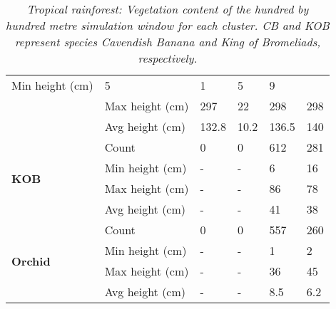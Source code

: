 \begin{table}[htb!]
\begin{tabular}{|p{2cm}|p{2cm}|p{2cm}|p{2cm}|p{2cm}|p{2cm}|}
						\multicolumn{1}{l|}{Min height (cm)} & 
						\multicolumn{1}{l|}{5} & 
						\multicolumn{1}{l|}{1} &
						\multicolumn{1}{l|}{5} & 
						\multicolumn{1}{l|}{9} \\\cline{2-6} &
						\multicolumn{1}{l|}{Max height (cm)} & 
						\multicolumn{1}{l|}{297} & 
						\multicolumn{1}{l|}{22} &
						\multicolumn{1}{l|}{298} & 
						\multicolumn{1}{l|}{298} \\\cline{2-6} &
						\multicolumn{1}{l|}{Avg height (cm)} & 
						\multicolumn{1}{l|}{132.8} & 
						\multicolumn{1}{l|}{10.2} &
						\multicolumn{1}{l|}{136.5} & 
						\multicolumn{1}{l|}{140} \\\cline{2-6}
		\hline      
		\multirow{4}{*}{\textbf{KOB}} & 
						\multicolumn{1}{l|}{Count} & 
						\multicolumn{1}{l|}{0} & 
						\multicolumn{1}{l|}{0} &
						\multicolumn{1}{l|}{612} & 
						\multicolumn{1}{l|}{281} \\\cline{2-6} &
						\multicolumn{1}{l|}{Min height (cm)} & 
						\multicolumn{1}{l|}{-} & 
						\multicolumn{1}{l|}{-} &
						\multicolumn{1}{l|}{6} & 
						\multicolumn{1}{l|}{16} \\\cline{2-6} &
						\multicolumn{1}{l|}{Max height (cm)} & 
						\multicolumn{1}{l|}{-} & 
						\multicolumn{1}{l|}{-} &
						\multicolumn{1}{l|}{86} & 
						\multicolumn{1}{l|}{78} \\\cline{2-6} &
						\multicolumn{1}{l|}{Avg height (cm)} & 
						\multicolumn{1}{l|}{-} & 
						\multicolumn{1}{l|}{-} &
						\multicolumn{1}{l|}{41} & 
						\multicolumn{1}{l|}{38} \\\cline{2-6}
		\hline     
		\multirow{4}{*}{\textbf{Orchid}} & 
						\multicolumn{1}{l|}{Count} & 
						\multicolumn{1}{l|}{0} & 
						\multicolumn{1}{l|}{0} &
						\multicolumn{1}{l|}{557} & 
						\multicolumn{1}{l|}{260} \\\cline{2-6} &
						\multicolumn{1}{l|}{Min height (cm)} & 
						\multicolumn{1}{l|}{-} & 
						\multicolumn{1}{l|}{-} &
						\multicolumn{1}{l|}{1} & 
						\multicolumn{1}{l|}{2} \\\cline{2-6} &
						\multicolumn{1}{l|}{Max height (cm)} & 
						\multicolumn{1}{l|}{-} & 
						\multicolumn{1}{l|}{-} &
						\multicolumn{1}{l|}{36} & 
						\multicolumn{1}{l|}{45} \\\cline{2-6} &
						\multicolumn{1}{l|}{Avg height (cm)} & 
						\multicolumn{1}{l|}{-} & 
						\multicolumn{1}{l|}{-} &
						\multicolumn{1}{l|}{8.5} & 
						\multicolumn{1}{l|}{6.2} \\\cline{2-6}
		\hline                                                       
		\end{tabular}
	\caption{\textit{Tropical rainforest: Vegetation content of the hundred by hundred metre simulation window for each cluster. CB and KOB represent species Cavendish Banana and King of Bromeliads, respectively.}}
	\label{tab:results_tropical_species_cluster_properties}	
\end{table}

